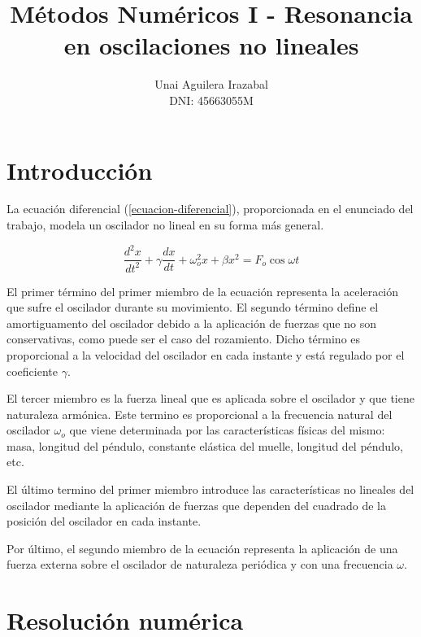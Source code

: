 \documentclass[11pt]{article}
\title{Métodos Numéricos I - Resonancia en oscilaciones no lineales}
\author{Unai Aguilera Irazabal\\ DNI: 45663055M}
\begin{document}
\maketitle
\tableofcontents

\pagebreak
\renewcommand{\tablename}{Tabla}

\section{Introducción}
La ecuación diferencial (\ref{ecuacion-diferencial}), proporcionada en el enunciado del trabajo, modela un oscilador no lineal en su forma más general.

\begin{equation}
\label{ecuacion-diferencial}
	 \frac{d^2 x}{dt^2} + \gamma\frac{dx}{dt} + \omega_{o}^2x + \beta{}x^2 = F_{o}\cos{\omega{}t}
\end{equation}

El primer término del primer miembro de la ecuación representa la aceleración que sufre el oscilador durante su movimiento. El segundo término
define el amortiguamento del oscilador debido a la aplicación de fuerzas que no son conservativas, como puede ser el caso del rozamiento. Dicho término es proporcional a la velocidad del oscilador en cada instante y está regulado por el coeficiente $\gamma$.

El tercer miembro es la fuerza lineal que es aplicada sobre el oscilador y que tiene naturaleza armónica. Este termino es proporcional a la frecuencia natural del oscilador $\omega_{o}$ que viene determinada por las características físicas del mismo: masa, longitud del péndulo, constante elástica del muelle, longitud del péndulo, etc.

El último termino del primer miembro introduce las características no lineales del oscilador mediante la aplicación de fuerzas que dependen del cuadrado de la posición del oscilador en cada instante.

Por último, el segundo miembro de la ecuación representa la aplicación de una fuerza externa sobre el oscilador de naturaleza periódica y con una frecuencia $\omega$.

\section{Resolución numérica}
\end{document}
